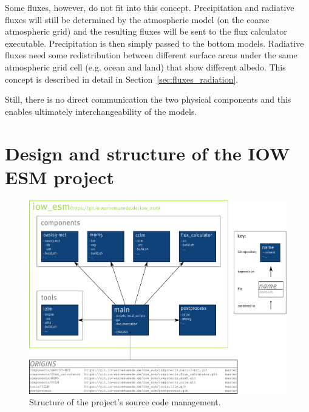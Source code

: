 \documentclass[a4paper,titlepage]{scrartcl}
\begin{document}
Some fluxes, however, do not fit into this concept. Precipitation and radiative fluxes will still be determined by the atmospheric model (on the coarse atmospheric grid) and the resulting fluxes will be sent to the flux calculator executable. Precipitation is then simply passed to the bottom models. Radiative fluxes need some redistribution between different surface areas under the same atmospheric grid cell (e.g. ocean and land) that show different albedo. This concept is described in detail in Section~\ref{sec:fluxes_radiation}.

Still, there is no direct communication the two physical components and this enables ultimately interchangeability of the models.

\newpage
\section{Design and structure of the IOW ESM project}

\begin{figure}[H]
	\centering
	\includegraphics[width=\linewidth]{"./figures/project_structure.pdf"} 
	\caption{Structure of the project's source code management.}
\end{figure}

\newpage
\end{document}
